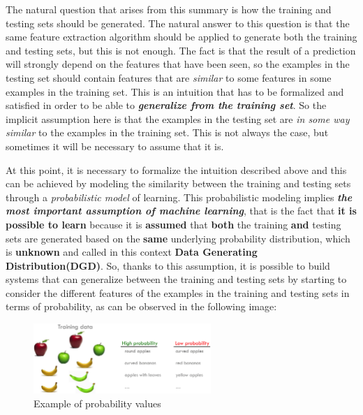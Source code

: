 The natural question that arises from this summary is how the training
and testing sets should be generated. The natural answer to this
question is that the same feature extraction algorithm should be applied
to generate both the training and testing sets, but this is not enough.
The fact is that the result of a prediction will strongly depend on the
features that have been seen, so the examples in the testing set should
contain features that are \emph{similar} to some features in some
examples in the training set. This is an intuition that has to be
formalized and satisfied in order to be able to
\emph{\textbf{generalize from the training set}}. So the implicit
assumption here is that the examples in the testing set are
\emph{in some way similar} to the examples in the training set.
This is not always the case, but sometimes it will be necessary
to assume that it is.

At this point, it is necessary to formalize the intuition described
above and this can be achieved by modeling the similarity between
the training and testing sets through a \emph{probabilistic model}
of learning. This probabilistic modeling implies
\emph{\textbf{the most important assumption of machine learning}},
that is the fact that \textbf{it is possible to learn} because it is
\textbf{assumed} that \textbf{both} the training
\textbf{and} testing sets are generated based on the \textbf{same}
underlying probability distribution, which is \textbf{unknown} and
called in this context \textbf{Data Generating Distribution(DGD)}.
So, thanks to this assumption, it is possible to build systems that
can generalize between the training and testing sets by starting to
consider the different features of the examples in the training
and testing sets in terms of probability, as can be observed in the
following image:

\vspace{5mm}

\begin{figure}[h]
      \centering
      \includegraphics[width=0.6\textwidth]{../img/Testing_set_prob}
      \caption{Example of probability values}
\end{figure}

